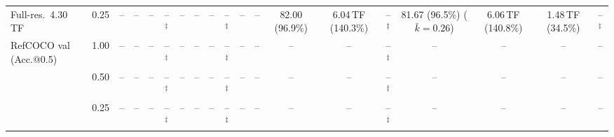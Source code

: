 \begin{table}[t]
{\begin{tabular}{l c | c c c c | c c c c | c c | c c c | c c c c}
{\footnotesize Full-res.\ 4.30\,TF} & 0.25 & -- & -- & -- & --$^\ddagger$ & -- & -- & -- & --$^\ddagger$ & -- & -- & 82.00 (96.9\%) & 6.04\,TF (140.3\%) & --$^\ddagger$ & 81.67 (96.5\%) {\footnotesize ($\bar k{=}0.26$)} & 6.06\,TF (140.8\%) & 1.48\,TF (34.5\%) & --$^\ddagger$ \\
\cmidrule(lr){1-19}
RefCOCO val (Acc.@0.5) & 1.00 & -- & -- & -- & --$^\ddagger$ & -- & -- & -- & --$^\ddagger$ & -- & -- & -- & -- & --$^\ddagger$ & -- & -- & -- & -- \\
 & 0.50 & -- & -- & -- & --$^\ddagger$ & -- & -- & -- & --$^\ddagger$ & -- & -- & -- & -- & --$^\ddagger$ & -- & -- & -- & -- \\
 & 0.25 & -- & -- & -- & --$^\ddagger$ & -- & -- & -- & --$^\ddagger$ & -- & -- & -- & -- & --$^\ddagger$ & -- & -- & -- & -- \\
\bottomrule
\end{tabular}}
\end{table}
